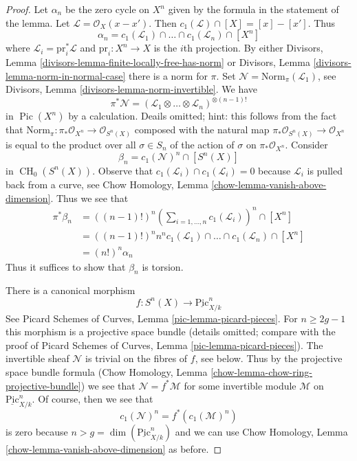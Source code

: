 \documentclass[10pt,a4paper]{amsart}
\theoremstyle{plain}
\theoremstyle{definition}
\theoremstyle{remark}
\numberwithin{equation}{subsection}
\def\CH{\mathop{\mathrm{CH}}\nolimits}
\def\Pic{\mathop{\mathrm{Pic}}\nolimits}
\def\Picardfunctor{\mathrm{Pic}}
\begin{document}
\begin{proof}
\medskip\noindent
Let $\alpha_n$ be the zero cycle on $X^n$ given by the formula in the
statement of the lemma. Let $\mathcal{L} = \mathcal{O}_X(x - x')$. Then
$c_1(\mathcal{L}) \cap [X] = [x] - [x']$. Thus
$$
\alpha_n = c_1(\mathcal{L}_1) \cap \ldots \cap c_1(\mathcal{L}_n) \cap [X^n]
$$
where $\mathcal{L}_i = \text{pr}_i^*\mathcal{L}$ and $\text{pr}_i : X^n \to X$
is the $i$th projection. By either
Divisors, Lemma \ref{divisors-lemma-finite-locally-free-has-norm} or
Divisors, Lemma \ref{divisors-lemma-norm-in-normal-case}
there is a norm for $\pi$. Set
$\mathcal{N} = \text{Norm}_\pi(\mathcal{L}_1)$, 
see Divisors, Lemma \ref{divisors-lemma-norm-invertible}. We have
$$
\pi^*\mathcal{N} =
(\mathcal{L}_1 \otimes \ldots \otimes \mathcal{L}_n)^{\otimes (n - 1)!}
$$
in $\Pic(X^n)$ by a calculation. Deails omitted; hint: this follows from
the fact that
$\text{Norm}_\pi : \pi_*\mathcal{O}_{X^n} \to \mathcal{O}_{S^n(X)}$
composed with the natural map $\pi_*\mathcal{O}_{S^n(X)} \to \mathcal{O}_{X^n}$
is equal to the product over all $\sigma \in S_n$ of the action of
$\sigma$ on $\pi_*\mathcal{O}_{X^n}$. Consider
$$
\beta_n = c_1(\mathcal{N})^n \cap [S^n(X)]
$$
in $\CH_0(S^n(X))$. Observe that
$c_1(\mathcal{L}_i) \cap c_1(\mathcal{L}_i) = 0$
because $\mathcal{L}_i$ is pulled back from a curve, see
Chow Homology, Lemma \ref{chow-lemma-vanish-above-dimension}. Thus we see that
\begin{align*}
\pi^*\beta_n
& =
((n - 1)!)^n
(\sum\nolimits_{i = 1, \ldots, n} c_1(\mathcal{L}_i))^n \cap [X^n] \\
& =
((n - 1)!)^n n^n 
c_1(\mathcal{L}_1) \cap \ldots \cap c_1(\mathcal{L}_n) \cap [X^n] \\
& =
(n!)^n \alpha_n
\end{align*}
Thus it suffices to show that $\beta_n$ is torsion.

\medskip\noindent
There is a canonical morphism
$$
f : S^n(X) \longrightarrow \underline{\Picardfunctor}^n_{X/k}
$$
See Picard Schemes of Curves, Lemma \ref{pic-lemma-picard-pieces}.
For $n \geq 2g - 1$ this morphism is a projective space bundle
(details omitted; compare with the
proof of Picard Schemes of Curves, Lemma \ref{pic-lemma-picard-pieces}).
The invertible sheaf $\mathcal{N}$ is trivial on the
fibres of $f$, see below. Thus by the projective space bundle formula
(Chow Homology, Lemma \ref{chow-lemma-chow-ring-projective-bundle})
we see that $\mathcal{N} = f^*\mathcal{M}$ for some invertible
module $\mathcal{M}$ on $\underline{\Picardfunctor}^n_{X/k}$.
Of course, then we see that
$$
c_1(\mathcal{N})^n = f^*(c_1(\mathcal{M})^n)
$$
is zero because $n > g = \dim(\underline{\Picardfunctor}^n_{X/k})$
and we can use Chow Homology, Lemma \ref{chow-lemma-vanish-above-dimension}
as before.


\end{proof}
\end{document}
